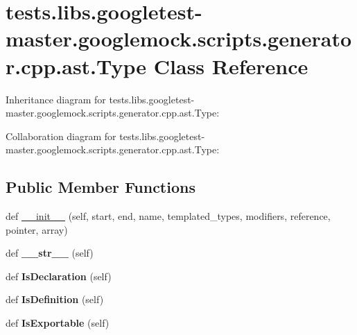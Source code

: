 \hypertarget{classtests_1_1libs_1_1googletest-master_1_1googlemock_1_1scripts_1_1generator_1_1cpp_1_1ast_1_1Type}{}\section{tests.\+libs.\+googletest-\/master.googlemock.\+scripts.\+generator.\+cpp.\+ast.\+Type Class Reference}
\label{classtests_1_1libs_1_1googletest-master_1_1googlemock_1_1scripts_1_1generator_1_1cpp_1_1ast_1_1Type}


Inheritance diagram for tests.\+libs.\+googletest-\/master.googlemock.\+scripts.\+generator.\+cpp.\+ast.\+Type\+:


Collaboration diagram for tests.\+libs.\+googletest-\/master.googlemock.\+scripts.\+generator.\+cpp.\+ast.\+Type\+:
\subsection*{Public Member Functions}
\begin{DoxyCompactItemize}
\item 
def \hyperlink{classtests_1_1libs_1_1googletest-master_1_1googlemock_1_1scripts_1_1generator_1_1cpp_1_1ast_1_1Type_a3d587dda6596af327d07e64e726f44a0}{\+\_\+\+\_\+init\+\_\+\+\_\+} (self, start, end, name, templated\+\_\+types, modifiers, reference, pointer, array)
\item 
\mbox{\label{classtests_1_1libs_1_1googletest-master_1_1googlemock_1_1scripts_1_1generator_1_1cpp_1_1ast_1_1Type_a9b6da680bcf947a4ea297cc2de763d71}} 
def {\bfseries \+\_\+\+\_\+str\+\_\+\+\_\+} (self)
\item 
\mbox{\label{classtests_1_1libs_1_1googletest-master_1_1googlemock_1_1scripts_1_1generator_1_1cpp_1_1ast_1_1Type_a8df0e8f8f95d4e2da8e4303c4c8a1346}} 
def {\bfseries Is\+Declaration} (self)
\item 
\mbox{\label{classtests_1_1libs_1_1googletest-master_1_1googlemock_1_1scripts_1_1generator_1_1cpp_1_1ast_1_1Type_ae1b871e47123b38d5d4a874426b4db35}} 
def {\bfseries Is\+Definition} (self)
\item 
\mbox{\label{classtests_1_1libs_1_1googletest-master_1_1googlemock_1_1scripts_1_1generator_1_1cpp_1_1ast_1_1Type_ac8dae3aba33d85f91d7d6c4de0a07d05}} 
def {\bfseries Is\+Exportable} (self)
\end{DoxyCompactItemize}
